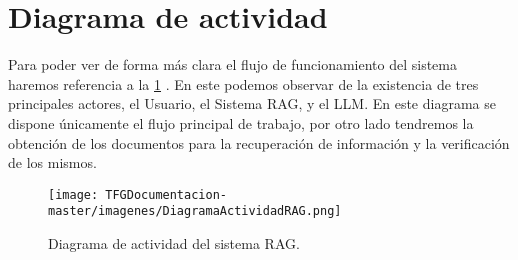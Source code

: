 \section{Diagrama de actividad}

Para poder ver de forma más clara el flujo de funcionamiento del sistema haremos referencia a la \ref{Fig.DiagramAct} . En este podemos observar de la existencia de tres principales actores, el Usuario, el Sistema RAG, y el LLM. En este diagrama se dispone únicamente el flujo principal de trabajo, por otro lado tendremos la obtención de los documentos para la recuperación de información y la verificación de los mismos.


\begin{figure}[hbt!]
    \centering
    \texttt{[image: TFGDocumentacion-master/imagenes/DiagramaActividadRAG.png]}
    \caption{Diagrama de actividad del sistema RAG.}
    \label{Fig.DiagramAct}
\end{figure}





